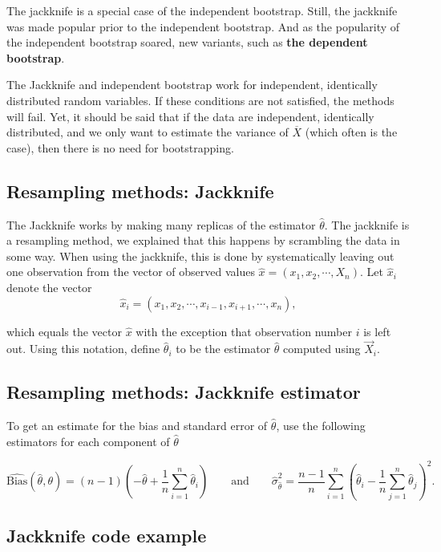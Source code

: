 \documentclass[%
oneside,                 %
final,                   %
10pt]{article}
\begin{document}
The jackknife is a special case of the independent bootstrap. Still, the jackknife was made
popular prior to the independent bootstrap. And as the popularity of
the independent bootstrap soared, new variants, such as \textbf{the dependent bootstrap}.

The Jackknife and independent bootstrap work for
independent, identically distributed random variables.
If these conditions are not
satisfied, the methods will fail.  Yet, it should be said that if the data are
independent, identically distributed, and we only want to estimate the
variance of $\overline{X}$ (which often is the case), then there is no
need for bootstrapping. 

\subsection*{Resampling methods: Jackknife}

The Jackknife works by making many replicas of the estimator $\widehat{\theta}$. 
The jackknife is a resampling method, we explained that this happens by scrambling the data in some way. When using the jackknife, this is done by systematically leaving out one observation from the vector of observed values $\hat{x} = (x_1,x_2,\cdots,X_n)$. 
Let $\hat{x}_i$ denote the vector
\[
\hat{x}_i = (x_1,x_2,\cdots,x_{i-1},x_{i+1},\cdots,x_n),
\]

which equals the vector $\hat{x}$ with the exception that observation
number $i$ is left out. Using this notation, define
$\widehat{\theta}_i$ to be the estimator
$\widehat{\theta}$ computed using $\vec{X}_i$. 

\subsection*{Resampling methods: Jackknife estimator}

To get an estimate for the bias and
standard error of $\widehat{\theta}$, use the following
estimators for each component of $\widehat{\theta}$

\[
\widehat{\mathrm{Bias}}(\widehat \theta,\theta) = (n-1)\left( - \widehat{\theta} + \frac{1}{n}\sum_{i=1}^{n} \widehat \theta_i \right) \qquad \text{and} \qquad \widehat{\sigma}^2_{\widehat{\theta} } = \frac{n-1}{n}\sum_{i=1}^{n}( \widehat{\theta}_i - \frac{1}{n}\sum_{j=1}^{n}\widehat \theta_j )^2.
\]

\subsection*{Jackknife code example}
\end{document}
